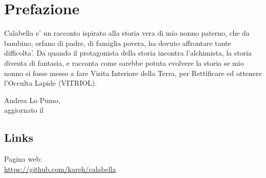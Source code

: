 \chapter{Prefazione}

Calabella e' un racconto ispirato alla storia vera di mio nonno paterno, che da bambino, orfano di padre, di famiglia povera, ha dovuto affrontare tante difficolta'. Da quando il protagonista della storia incontra l'alchimista, la storia diventa di fantasia, e racconta come sarebbe potuta evolvere la storia se mio nonno si fosse messo a fare Visita Interiore della Terra, per Rettificare ed ottenere l'Occulta Lapide (VITRIOL).

\begin{flushright}
    \vspace*{\fill}
    Andrea Lo Pumo, \finishDate\\
    aggiornato il \lastUpdateDate
\end{flushright}

\section{Links}

Pagina web:\\
\url{https://github.com/kareh/calabella}


